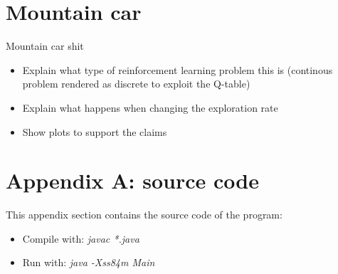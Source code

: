 \documentclass[runningheads]{llncs}
\begin{document}
\section{Mountain car}
Mountain car shit
\begin{itemize}
\item Explain what type of reinforcement learning problem this is
  (continous problem rendered as discrete to exploit the Q-table)
\item Explain what happens when changing the exploration rate
\item Show plots to support the claims
\end{itemize}


\section{Appendix A: source code}\label{appendix}
This appendix section contains the source code of the program:
\begin{itemize}
\item Compile with: \textit{javac *.java}
\item Run with: \textit{java -Xss84m Main}
\end{itemize}





\end{document}
